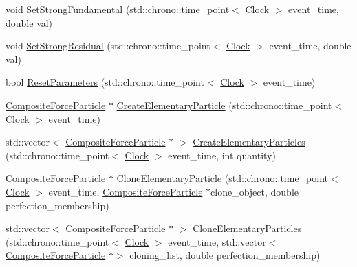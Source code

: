 \begin{DoxyCompactItemize}
\item 
void \hyperlink{class_composite_force_particle_a28d835658edcbecf60162475a8cb1ab6}{Set\+Strong\+Fundamental} (std\+::chrono\+::time\+\_\+point$<$ \hyperlink{universe_8h_a0ef8d951d1ca5ab3cfaf7ab4c7a6fd80}{Clock} $>$ event\+\_\+time, double val)
\item 
void \hyperlink{class_composite_force_particle_aeba1070d4ec6e52fd8276e38c6a6c2e1}{Set\+Strong\+Residual} (std\+::chrono\+::time\+\_\+point$<$ \hyperlink{universe_8h_a0ef8d951d1ca5ab3cfaf7ab4c7a6fd80}{Clock} $>$ event\+\_\+time, double val)
\item 
bool \hyperlink{class_composite_force_particle_ab4767179e32f6d2b4b31941dd3c48b10}{Reset\+Parameters} (std\+::chrono\+::time\+\_\+point$<$ \hyperlink{universe_8h_a0ef8d951d1ca5ab3cfaf7ab4c7a6fd80}{Clock} $>$ event\+\_\+time)
\item 
\hyperlink{class_composite_force_particle}{Composite\+Force\+Particle} $\ast$ \hyperlink{class_composite_force_particle_a0806069e389e30c63572c4cd6b9776d7}{Create\+Elementary\+Particle} (std\+::chrono\+::time\+\_\+point$<$ \hyperlink{universe_8h_a0ef8d951d1ca5ab3cfaf7ab4c7a6fd80}{Clock} $>$ event\+\_\+time)
\item 
std\+::vector$<$ \hyperlink{class_composite_force_particle}{Composite\+Force\+Particle} $\ast$ $>$ \hyperlink{class_composite_force_particle_afff866fe6f363c33c3b49fcca9005706}{Create\+Elementary\+Particles} (std\+::chrono\+::time\+\_\+point$<$ \hyperlink{universe_8h_a0ef8d951d1ca5ab3cfaf7ab4c7a6fd80}{Clock} $>$ event\+\_\+time, int quantity)
\item 
\hyperlink{class_composite_force_particle}{Composite\+Force\+Particle} $\ast$ \hyperlink{class_composite_force_particle_a559031016355b79ee795e621fdbbdb13}{Clone\+Elementary\+Particle} (std\+::chrono\+::time\+\_\+point$<$ \hyperlink{universe_8h_a0ef8d951d1ca5ab3cfaf7ab4c7a6fd80}{Clock} $>$ event\+\_\+time, \hyperlink{class_composite_force_particle}{Composite\+Force\+Particle} $\ast$clone\+\_\+object, double perfection\+\_\+membership)
\item 
std\+::vector$<$ \hyperlink{class_composite_force_particle}{Composite\+Force\+Particle} $\ast$ $>$ \hyperlink{class_composite_force_particle_ac27e6d3bb56272728a8c197dbcd2db4e}{Clone\+Elementary\+Particles} (std\+::chrono\+::time\+\_\+point$<$ \hyperlink{universe_8h_a0ef8d951d1ca5ab3cfaf7ab4c7a6fd80}{Clock} $>$ event\+\_\+time, std\+::vector$<$ \hyperlink{class_composite_force_particle}{Composite\+Force\+Particle} $\ast$$>$ cloning\+\_\+list, double perfection\+\_\+membership)
$$
\end{DoxyCompactItemize}
